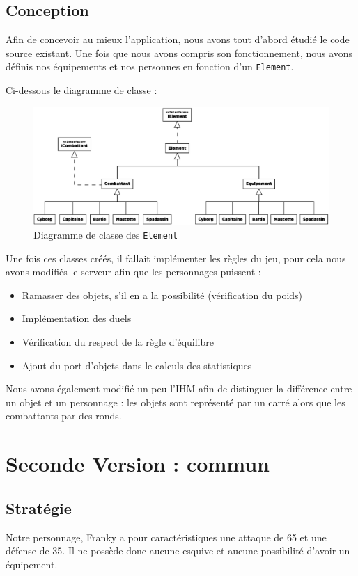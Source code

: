 \documentclass[12pt,a4paper,openany]{book}
\begin{document}
	\section{Conception}
		Afin de concevoir au mieux l'application, nous avons tout d'abord étudié le code source existant. Une fois que nous avons compris son fonctionnement,
		nous avons définis nos équipements et nos personnes en fonction d'un \texttt{Element}.

		Ci-dessous le diagramme de classe : 

		\begin{figure}[H]
			\centering
			\includegraphics[width=12cm]{Diagramme1.eps}
			\caption{Diagramme de classe des \texttt{Element}}
		\end{figure}

		Une fois ces classes créés, il fallait implémenter les règles du jeu, pour cela nous avons modifiés le serveur afin que les personnages puissent : 
		\begin{itemize}
			\item Ramasser des objets, s'il en a la possibilité (vérification du poids)
			\item Implémentation des duels
			\item Vérification du respect de la règle d'équilibre
			\item Ajout du port d'objets dans le calculs des statistiques
		\end{itemize}

		Nous avons également modifié un peu l'IHM afin de distinguer la différence entre un objet et un personnage : les objets sont représenté par un carré
		alors que les combattants par des ronds.

	\chapter{Seconde Version : commun}
	\section{Stratégie}
Notre personnage, Franky a pour caractéristiques une attaque de 65 et une défense de 35. Il ne possède donc aucune esquive et aucune possibilité d’avoir un
équipement. 
\end{document}

